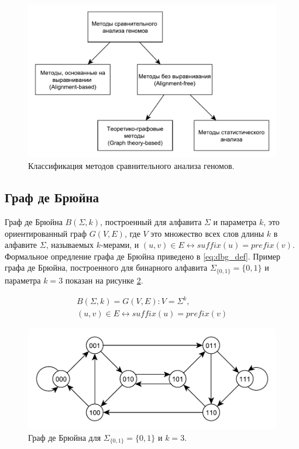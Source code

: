 \begin{figure}[htbp]
	\includegraphics[width=\textwidth]{img/classif.pdf}
	\caption{Классификация методов сравнительного анализа геномов.}
	\label{fig:classif}
\end{figure}

\subsection{Граф де Брюйна}

Граф де Брюйна $ B\left(\Sigma,k\right) $, построенный для алфавита $ \Sigma  $ и параметра $ k $, это ориентированный граф $ G\left(V,E\right) $, где $ V $ это множество всех слов длины $ k $ в алфавите $ \Sigma $, называемых $ k$-мерами, и $ \left(u,v\right)\in E\leftrightarrow suffix\left(u\right)=prefix\left(v\right) $. Формальное опредление графа де Брюйна приведено в \ref{eq:dbg_def}. Пример графа де Брюйна, построенного для бинарного алфавита $ \Sigma_{\{0,1\}}=\{0,1\} $ и параметра $ k=3 $ показан на рисунке \ref{fig:dbg_ex}.

\begin{equation}
	\begin{split}
		B\left(\Sigma,k\right)=G\left(V,E\right): V=\Sigma^k, \\
		\left(u,v\right)\in E\leftrightarrow suffix\left(u\right)=prefix\left(v\right)
	\end{split}
	\label{eq:dbg_def}
\end{equation}


\begin{figure}[htbp]
	\includegraphics[width=\textwidth]{img/dbg_ex.pdf}
	\caption{Граф де Брюйна для $ \Sigma_{\{0,1\}}=\{0,1\} $ и $ k=3 $.}
	\label{fig:dbg_ex}
\end{figure}

